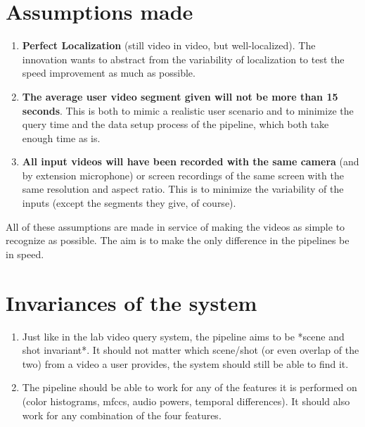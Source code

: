 \documentclass{article}
\begin{document}
\section*{Assumptions made}
\begin{enumerate}
    \item \textbf{Perfect Localization} (still video in video, but well-localized). The innovation wants to abstract from the variability of localization to test the speed improvement as much as possible.
    \item \textbf{The average user video segment given will not be more than 15 seconds}. This is both to mimic a realistic user scenario and to minimize the query time and the data setup process of the pipeline, which both take enough time as is. 
    \item \textbf{All input videos will have been recorded with the same camera} (and by extension microphone) or screen recordings of the same screen with the same resolution and aspect ratio. This is to minimize the variability of the inputs (except the segments they give, of course).


\end{enumerate}

All of these assumptions are made in service of making the videos as simple to recognize as possible. The aim is to make the only difference in the pipelines be in speed. 


\section*{Invariances of the system}
\begin{enumerate}
    \item Just like in the lab video query system, the pipeline aims to be *scene and shot invariant*. It should not matter which scene/shot (or even overlap of the two) from a video a user provides, the system should still be able to find it. 
    \item The pipeline should be able to work for any of the features it is performed on (color histograms, mfccs, audio powers, temporal differences). It should also work for any combination of the four features.
\end{enumerate}
\end{document}
